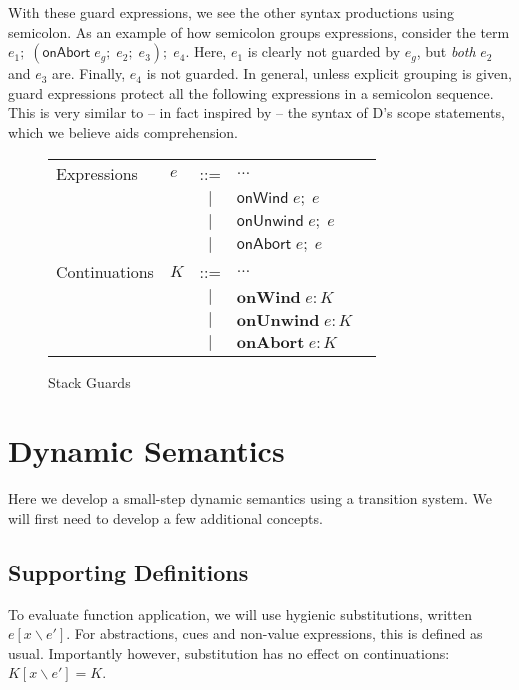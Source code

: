 \documentclass[11pt]{article}
\newcommand{\onWind}[2]{\textsf{onWind}\;#1;\;#2}
\newcommand{\onUnwind}[2]{\textsf{onUnwind}\;#1;\;#2}
\newcommand{\onAbort}[2]{\textsf{onAbort}\;#1;\;#2}
\begin{document}
With these guard expressions, we see the other syntax productions using semicolon.
As an example of how semicolon groups expressions, consider the term $e_1;\;(\textsf{onAbort}\;e_g;\;e_2;\;e_3);\;e_4$.
Here, $e_1$ is clearly not guarded by $e_g$, but \emph{both} $e_2$ and $e_3$ are.
Finally, $e_4$ is not guarded.
In general, unless explicit grouping is given, guard expressions protect all the following expressions in a semicolon sequence.
This is very similar to -- in fact inspired by -- the syntax of D's scope statements, which we believe aids comprehension.

\begin{figure}[h!]
\caption{Stack Guards}
\label{fig:addGuards}

\begin{tabular}{llcll}
Expressions & $e$ & ::= & $\ldots$ \\
& & $|$ & $\onWind{e}{e}$ \\
& & $|$ & $\onUnwind{e}{e}$ \\
& & $|$ & $\onAbort{e}{e}$ \\
Continuations & $K$ & ::= & $\ldots$ \\
& & $|$ & $\textbf{onWind}\;e:K$ \\
& & $|$ & $\textbf{onUnwind}\;e:K$ \\
& & $|$ & $\textbf{onAbort}\;e:K$ \\
\end{tabular}
\end{figure}





\section{Dynamic Semantics}
\label{sec:evaluation}

Here we develop a small-step dynamic semantics using a transition system.
We will first need to develop a few additional concepts.

\subsection{Supporting Definitions}

To evaluate function application, we will use hygienic substitutions, written $e[x\backslash e']$.
For abstractions, cues and non-value expressions, this is defined as usual.
Importantly however, substitution has no effect on continuations: $K[x\backslash e'] = K$.
\end{document}
